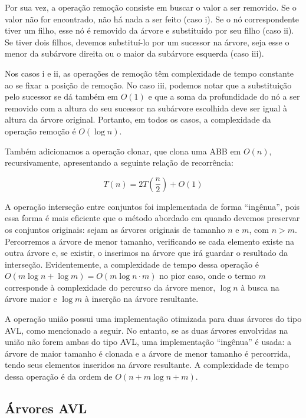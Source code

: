 \documentclass[a4paper,12pt]{report}
\begin{document}
Por sua vez, a operação remoção consiste em buscar o valor a ser removido. Se o
valor não for encontrado, não há nada a ser feito (caso \Rn{1}). Se o nó 
correspondente tiver um filho, esse nó é removido da árvore e substituído por 
seu filho (caso \Rn{2}). Se tiver dois filhos, devemos substituí-lo por um 
sucessor na árvore, seja esse o menor da subárvore direita ou o maior da subárvore 
esquerda (caso \Rn{3}).

Nos casos \Rn{1} e \Rn{2}, as operações de remoção têm complexidade de tempo constante 
ao se fixar a posição de remoção. No caso \Rn{3}, podemos notar que a substituição
pelo sucessor se dá também em $O(1)$ e que a soma da profundidade do nó a ser removido
com a altura do seu sucessor na subárvore escolhida deve ser igual à altura da árvore
original. Portanto, em todos os casos, a complexidade da operação remoção é $O(\log n)$.

Também adicionamos a operação clonar, que clona uma ABB em $O(n)$, recursivamente, 
apresentando a seguinte relação de recorrência:

\[
                      T(n) = 2T\left(\frac{n}{2}\right) + O(1)
\]

A operação interseção entre conjuntos foi implementada de forma ``ingênua'', pois 
essa forma é mais eficiente que o método abordado em \cite{bfs16} quando 
devemos preservar os conjuntos originais: sejam as árvores originais de tamanho $n$ 
e $m$, com $n > m$. Percorremos a árvore de menor tamanho, verificando se cada 
elemento existe na outra árvore e, se existir, o inserimos na árvore que irá guardar 
o resultado da interseção. Evidentemente, a complexidade de tempo dessa operação é 
$O(m \log{n} + \log{m}) = O(m \log{n \cdot m})$ no pior caso, onde o termo $m$ 
corresponde à complexidade do percurso da árvore menor, $\log n$ à busca na árvore 
maior e $\log m$ à inserção na árvore resultante.

A operação união possui uma implementação otimizada para duas árvores do tipo AVL,
como mencionado a seguir. No entanto, se as duas árvores envolvidas na união não
forem ambas do tipo AVL, uma implementação ``ingênua'' é usada: a árvore de maior
tamanho é clonada e a árvore de menor tamanho é percorrida, tendo seus elementos
inseridos na árvore resultante. A complexidade de tempo dessa operação é da ordem 
de $O(n + m \log{n + m})$. 

\subsection*{Árvores AVL}
\end{document}
